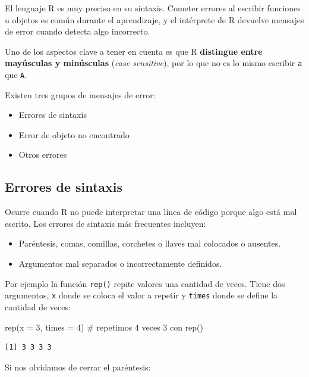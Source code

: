 \documentclass[
  spanish,
  letterpaper,
  DIV=11,
  numbers=noendperiod]{scrreprt}
\newenvironment{Shaded}{\begin{snugshade}}{\end{snugshade}}
\newcommand{\AttributeTok}[1]{\textcolor[rgb]{0.40,0.45,0.13}{#1}}
\newcommand{\CommentTok}[1]{\textcolor[rgb]{0.37,0.37,0.37}{#1}}
\newcommand{\DecValTok}[1]{\textcolor[rgb]{0.68,0.00,0.00}{#1}}
\newcommand{\FunctionTok}[1]{\textcolor[rgb]{0.28,0.35,0.67}{#1}}
\newcommand{\NormalTok}[1]{\textcolor[rgb]{0.00,0.23,0.31}{#1}}
\begin{document}
El lenguaje R es muy preciso en su sintaxis. Cometer errores al escribir
funciones u objetos es común durante el aprendizaje, y el intérprete de
R devuelve mensajes de error cuando detecta algo incorrecto.

Uno de los aspectos clave a tener en cuenta es que R \textbf{distingue
entre mayúsculas y minúsculas} (\emph{case sensitive}), por lo que no es
lo mismo escribir \texttt{a} que \texttt{A}.

Existen tres grupos de mensajes de error:

\begin{itemize}
\item
  Errores de sintaxis
\item
  Error de objeto no encontrado
\item
  Otros errores
\end{itemize}

\subsection{Errores de sintaxis}\label{errores-de-sintaxis}

Ocurre cuando R no puede interpretar una línea de código porque algo
está mal escrito. Los errores de sintaxis más frecuentes incluyen:

\begin{itemize}
\item
  Paréntesis, comas, comillas, corchetes o llaves mal colocados o
  ausentes.
\item
  Argumentos mal separados o incorrectamente definidos.
\end{itemize}

Por ejemplo la función \texttt{rep()} repite valores una cantidad de
veces. Tiene dos argumentos, \texttt{x} donde se coloca el valor a
repetir y \texttt{times} donde se define la cantidad de veces:

\begin{Shaded}
\begin{Highlighting}[]
\FunctionTok{rep}\NormalTok{(}\AttributeTok{x =} \DecValTok{3}\NormalTok{, }\AttributeTok{times =} \DecValTok{4}\NormalTok{) }\CommentTok{\# repetimos 4 veces 3 con rep()}
\end{Highlighting}
\end{Shaded}

\begin{verbatim}
[1] 3 3 3 3
\end{verbatim}

Si nos olvidamos de cerrar el paréntesis:
\end{document}
